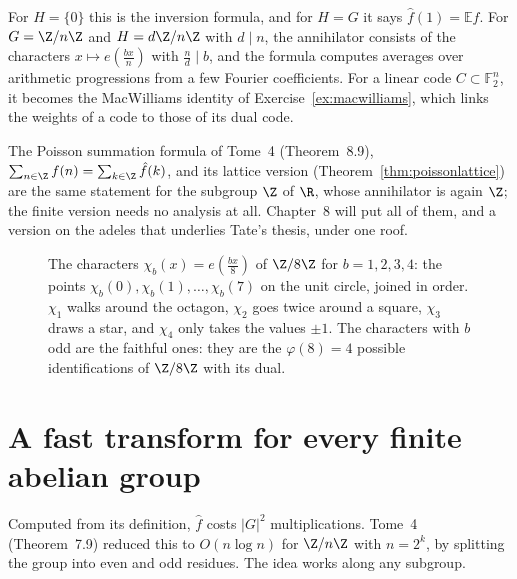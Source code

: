 For $H=\{0\}$ this is the inversion formula, and for $H=G$ it says $\hat f(1)=\mathbb E f$. For $G=\Z/n\Z$ and $H=d\Z/n\Z$ with $d\mid n$, the
annihilator consists of the characters $x\mapsto e(\frac{bx}n)$ with $\frac nd\mid b$, and the formula computes averages over arithmetic
progressions from a few Fourier coefficients. For a linear code $C\subset\mathbb F_2^n$, it becomes the MacWilliams identity of
Exercise~\ref{ex:macwilliams}, which links the weights of a code to those of its dual code.

\begin{beauty}
The Poisson summation formula of Tome~4 (Theorem~8.9), $\sum_{n\in\Z}f(n)=\sum_{k\in\Z}\hat f(k)$, and its lattice version
(Theorem~\ref{thm:poissonlattice}) are the same statement for the subgroup $\Z$ of $\R$, whose annihilator is again $\Z$; the finite
version needs no analysis at all. Chapter~8 will put all of them, and a version on the adeles that underlies Tate's thesis, under one
roof.
\end{beauty}

\begin{figure}[ht]
\centering
{}
\caption{The characters $\chi_b(x)=e(\frac{bx}8)$ of $\Z/8\Z$ for $b=1,2,3,4$: the points $\chi_b(0),\chi_b(1),\dots,\chi_b(7)$ on the unit circle,
joined in order. $\chi_1$ walks around the octagon, $\chi_2$ goes twice around a square, $\chi_3$ draws a star, and $\chi_4$ only takes the
values $\pm1$. The characters with $b$ odd are the faithful ones: they are the $\varphi(8)=4$ possible identifications of $\Z/8\Z$ with its dual.}
\label{fig:characters}
\end{figure}

\section{A fast transform for every finite abelian group}

Computed from its definition, $\hat f$ costs $|G|^2$ multiplications. Tome~4 (Theorem~7.9) reduced this to $O(n\log n)$ for $\Z/n\Z$ with
$n=2^k$, by splitting the group into even and odd residues. The idea works along any subgroup.

